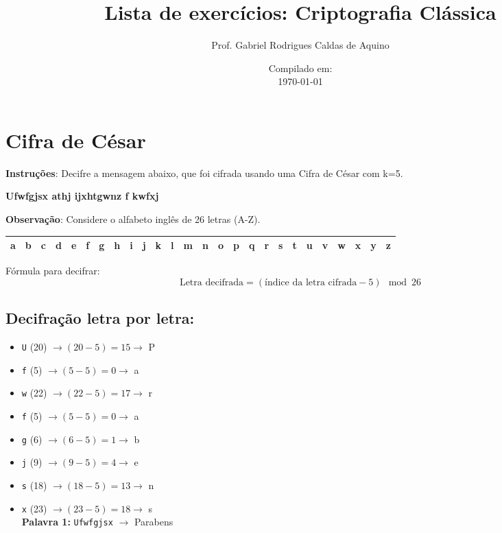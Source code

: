 \title{Lista de exercícios: Criptografia Clássica}
\author{Prof. Gabriel Rodrigues Caldas de Aquino}
\date{Compilado em: \\ \today}



\maketitle

\section{Cifra de César}

\textbf{Instruções}:
Decifre a mensagem abaixo, que foi cifrada usando uma Cifra de César com k=5. 

\textbf{Ufwfgjsx athj ijxhtgwnz f kwfxj}

\textbf{Observação}: Considere o alfabeto inglês de 26 letras (A-Z).


\begin{table}[h]
\centering
\begin{tabular}{|*{26}{c|}}
\hline
a & b & c & d & e & f & g & h & i & j & k & l & m & n & o & p & q & r & s & t & u & v & w & x & y & z \\

\hline
\end{tabular}
\end{table}

Fórmula para decifrar: 
\[
\text{Letra decifrada} = (\text{índice da letra cifrada} - 5) \mod 26
\]

\subsection*{Decifração letra por letra:}

\begin{itemize}
    \item \texttt{U} (20) \(\rightarrow (20 - 5) = 15 \rightarrow\) P
    \item \texttt{f} (5) \(\rightarrow (5 - 5) = 0 \rightarrow\) a
    \item \texttt{w} (22) \(\rightarrow (22 - 5) = 17 \rightarrow\) r
    \item \texttt{f} (5) \(\rightarrow (5 - 5) = 0 \rightarrow\) a
    \item \texttt{g} (6) \(\rightarrow (6 - 5) = 1 \rightarrow\) b
    \item \texttt{j} (9) \(\rightarrow (9 - 5) = 4 \rightarrow\) e
    \item \texttt{s} (18) \(\rightarrow (18 - 5) = 13 \rightarrow\) n
    \item \texttt{x} (23) \(\rightarrow (23 - 5) = 18 \rightarrow\) s \\
    \textbf{Palavra 1:} \texttt{Ufwfgjsx} \(\rightarrow\) Parabens
\end{itemize}


